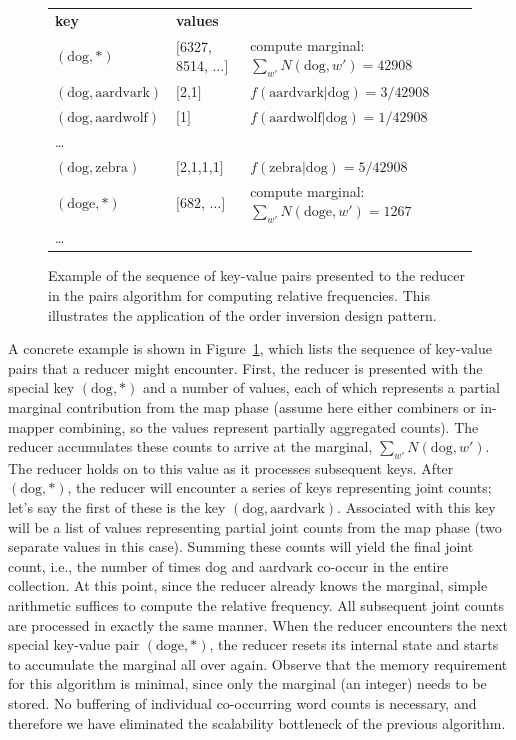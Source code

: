 \begin{figure}[t]
\begin{tabular}{lll}
{\bf key} & {\bf values} &  \\
$(\textrm{dog}, \ast)$        & $[$6327, 8514, $\ldots$$]$ & compute marginal: $\sum_{w'}{N(\textrm{dog},w')} = 42908$\\
$(\textrm{dog}, \textrm{aardvark})$ & $[$2,1$]$    & $f(\textrm{aardvark}|\textrm{dog}) = 3/42908$ \\
$(\textrm{dog}, \textrm{aardwolf})$ & $[$1$]$      & $f(\textrm{aardwolf}|\textrm{dog}) = 1/42908$ \\
\ldots            &      & \\
$(\textrm{dog}, \textrm{zebra})$    & $[$2,1,1,1$]$    & $f(\textrm{zebra}|\textrm{dog}) = 5/42908$ \\
$(\textrm{doge}, \ast)$       & $[$682, $\ldots$$]$  & compute marginal: $\sum_{w'}{N(\textrm{doge},w')} = 1267$\\
\ldots            &      & \\
\end{tabular}
\caption{Example of the sequence of key-value pairs presented to the
  reducer in the pairs algorithm for computing relative frequencies.
  This illustrates the application of the order inversion design
  pattern.}
\label{figure:chapter3:cond-prob-reducer}
\end{figure}

A concrete example is shown in
Figure~\ref{figure:chapter3:cond-prob-reducer}, which lists the
sequence of key-value pairs that a reducer might encounter.  First,
the reducer is presented with the special key $(\textrm{dog}, \ast)$
and a number of values, each of which represents a partial marginal
contribution from the map phase (assume here either combiners or
in-mapper combining, so the values represent partially aggregated
counts).  The reducer accumulates these counts to arrive at the
marginal, $\sum_{w'}{N(\textrm{dog},w')}$.  The reducer holds on to
this value as it processes subsequent keys.  After $(\textrm{dog},
\ast)$, the reducer will encounter a series of keys representing joint
counts; let's say the first of these is the key $(\textrm{dog},
\textrm{aardvark})$.  Associated with this key will be a list of
values representing partial joint counts from the map phase (two
separate values in this case).  Summing these counts will yield the
final joint count, i.e., the number of times dog and aardvark co-occur
in the entire collection.  At this point, since the reducer already
knows the marginal, simple arithmetic suffices to compute the relative
frequency.  All subsequent joint counts are processed in exactly the
same manner.  When the reducer encounters the next special key-value
pair $(\textrm{doge}, \ast)$, the reducer resets its internal state
and starts to accumulate the marginal all over again.  Observe that
the memory requirement for this algorithm is minimal, since only the
marginal (an integer) needs to be stored.  No buffering of individual
co-occurring word counts is necessary, and therefore we have
eliminated the scalability bottleneck of the previous algorithm.

